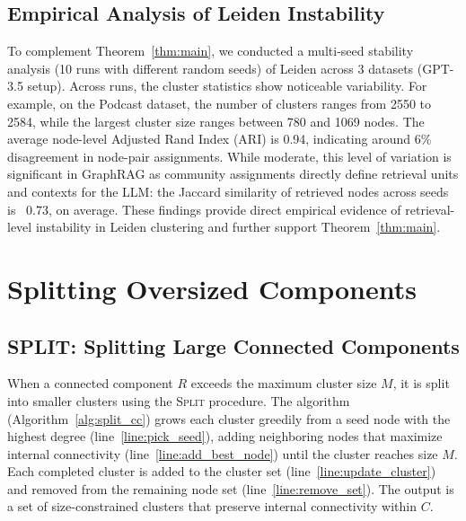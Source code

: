 \subsection{Empirical Analysis of Leiden Instability}
To complement Theorem~\ref{thm:main}, we conducted a multi-seed stability analysis (10 runs with different random seeds) of Leiden across 3 datasets (GPT-3.5 setup). 
Across runs, the cluster statistics show noticeable variability. For example, on the Podcast dataset, the number of clusters ranges from 2550 to 2584, while the largest cluster size ranges between 780 and 1069 nodes. The average node-level Adjusted Rand Index (ARI) is 0.94, indicating around 6\% disagreement in node-pair assignments.
While moderate, this level of variation is significant in GraphRAG as community assignments directly define retrieval units and contexts for the LLM: the Jaccard similarity of retrieved nodes across seeds is ~0.73, on average.
These findings provide direct empirical evidence of retrieval-level instability in Leiden clustering and further support Theorem~\ref{thm:main}.


\section{Splitting Oversized Components}

\subsection{SPLIT: Splitting Large Connected Components} \label{sec:split_cc}

When a connected component $R$ exceeds the maximum cluster size $M$, it is split into smaller clusters using the \textsc{Split} procedure. The algorithm (Algorithm~\ref{alg:split_cc}) grows each cluster greedily from a seed node with the highest degree (line~\ref{line:pick_seed}), adding neighboring nodes that maximize internal connectivity (line~\ref{line:add_best_node}) until the cluster reaches size $M$. Each completed cluster is added to the cluster set (line~\ref{line:update_cluster}) and removed from the remaining node set (line~\ref{line:remove_set}). The output is a set of size-constrained clusters that preserve internal connectivity within $C$.


